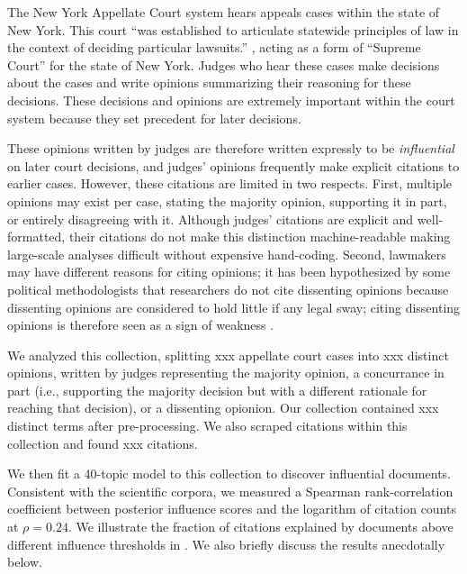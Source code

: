The New York Appellate Court system hears appeals cases within the
state of New York.  This court ``was established to articulate
statewide principles of law in the context of deciding particular
lawsuits.''  \cite{nyca_webpage:2012}, acting as a form of ``Supreme
Court'' for the state of New York.  Judges who hear these cases make
decisions about the cases and write opinions summarizing their
reasoning for these decisions.  These decisions and opinions are
extremely important within the court system because they set precedent
for later decisions.

These opinions written by judges are therefore written expressly to be
\emph{influential} on later court decisions, and judges' opinions
frequently make explicit citations to earlier cases.  However, these
citations are limited in two respects.  First, multiple opinions may
exist per case, stating the majority opinion, supporting it in part,
or entirely disagreeing with it. Although judges' citations are
explicit and well-formatted, their citations do not make this
distinction machine-readable making large-scale analyses difficult
without expensive hand-coding. Second, lawmakers may have different
reasons for citing opinions; it has been hypothesized by some
political methodologists that researchers do not cite dissenting
opinions because dissenting opinions are considered to hold little if
any legal sway; citing dissenting opinions is therefore seen as a sign
of weakness \cite{beim:2011}.

We analyzed this collection, splitting xxx appellate court cases into
xxx distinct opinions, written by judges representing the majority
opinion, a concurrance in part (i.e., supporting the majority decision
but with a different rationale for reaching that decision), or a
dissenting opionion.  Our collection contained xxx distinct terms
after pre-processing. We also scraped citations within this collection
and found xxx citations.

We then fit a 40-topic model to this collection to discover
influential documents.  Consistent with the scientific corpora, we
measured a Spearman rank-correlation coefficient between posterior
influence scores and the logarithm of citation counts at $\rho=0.24$.
We illustrate the fraction of citations explained by documents above
different influence thresholds in
.  We also briefly discuss the
results anecdotally below.

